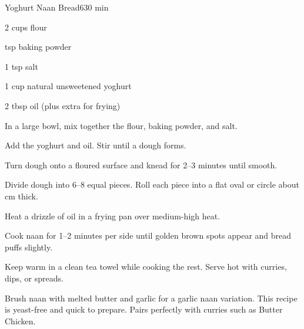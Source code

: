 \begin{recipebox}{Yoghurt Naan Bread}{6}{30 min}
\begin{ingredients}
  \item 2 cups flour
  \item {} tsp baking powder
  \item 1 tsp salt
  \item 1 cup natural unsweetened yoghurt
  \item 2 tbsp oil (plus extra for frying)
\end{ingredients}

\begin{method}
  \item In a large bowl, mix together the flour, baking powder, and salt.  
  \item Add the yoghurt and oil. Stir until a dough forms.  
  \item Turn dough onto a floured surface and knead for 2–3 minutes until smooth.  
  \item Divide dough into 6–8 equal pieces. Roll each piece into a flat oval or circle about  cm thick.  
  \item Heat a drizzle of oil in a frying pan over medium-high heat.  
  \item Cook naan for 1–2 minutes per side until golden brown spots appear and bread puffs slightly.  
  \item Keep warm in a clean tea towel while cooking the rest. Serve hot with curries, dips, or spreads.  
\end{method}

\begin{notes}
Brush naan with melted butter and garlic for a garlic naan variation.  
This recipe is yeast-free and quick to prepare.  
Pairs perfectly with curries such as Butter Chicken.  
\end{notes}
\end{recipebox}

